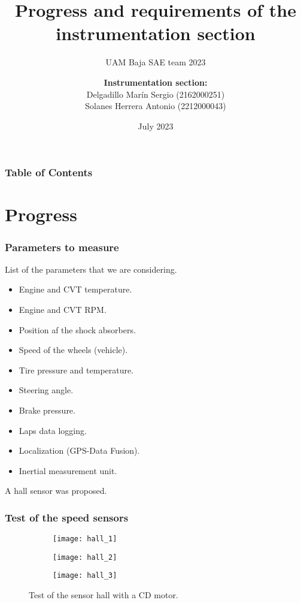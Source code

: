 \documentclass{beamer}
\title[UAM Baja SAE team 2023] %
{Progress and requirements of the instrumentation section}
\subtitle{UAM Baja SAE team 2023}
\author[Instrumentation section] {
	\textbf{Instrumentation section:} \\
	\vspace{0.5cm}
	 Delgadillo Marín Sergio (2162000251)\\
	 Solanes Herrera Antonio (2212000043) 
}
\date[July 2023] %
{July 2023}
\begin{document}
	
	\frame{\titlepage}
	
	\begin{frame}
		\frametitle{Table of Contents}
		\tableofcontents
	\end{frame}
	
	
	\section{Progress}
	
	\begin{frame}
		\frametitle{Parameters to measure}
		List of the parameters that we are considering.
		\begin{itemize}
			\item Engine and CVT temperature.
			\item Engine and CVT RPM.
			\item Position af the shock absorbers.
			\item Speed of the wheels (vehicle).
			\item Tire pressure and temperature.
			\item Steering angle.
			\item Brake pressure.
			\item Laps data logging.
			\item Localization (GPS-Data Fusion).
			\item Inertial measurement unit.
		\end{itemize}
	\end{frame}

	\begin{frame}
		A hall sensor was proposed.
		\frametitle{Test of the speed sensors}
		\begin{figure}
			\centering
			\begin{subfigure}[b]{0.3\textwidth}
				\centering
				\texttt{[image: hall\_1]}
			\end{subfigure}
			\hfill
			\begin{subfigure}[b]{0.3\textwidth}
				\centering
				\texttt{[image: hall\_2]}
			\end{subfigure}
			\hfill
		\begin{subfigure}[b]{0.3\textwidth}
			\centering
			\texttt{[image: hall\_3]}
		\end{subfigure}
			\caption{Test of the sensor hall with a CD motor.}
			\label{fig:hall}
		\end{figure}

	\end{frame}
\end{document}
